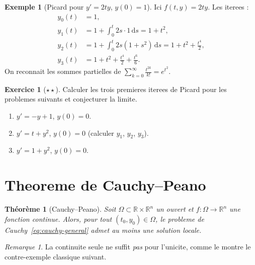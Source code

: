 \documentclass[12pt,a4paper,openany]{book}
\theoremstyle{definition}
\newtheorem{exemple}[definition]{Exemple}
\newtheorem{exercice}{Exercice}[chapter]
\theoremstyle{plain}
\newtheorem{theoreme}[definition]{Théorème}
\theoremstyle{remark}
\newtheorem{remarque}[definition]{Remarque}
\newcommand{\R}{\mathbb{R}}
\newcommand{\dd}{\mathrm{d}}
\begin{document}
\begin{exemple}[Picard pour $y' = 2ty$, $y(0) = 1$]\label{ex:picard-gauss}
Ici $f(t,y) = 2ty$. Les iterees :
\begin{align*}
y_0(t) &= 1, \\
y_1(t) &= 1 + \int_0^t 2s \cdot 1 \, \dd s = 1 + t^2, \\
y_2(t) &= 1 + \int_0^t 2s(1 + s^2)\, \dd s = 1 + t^2 + \frac{t^4}{2}, \\
y_3(t) &= 1 + t^2 + \frac{t^4}{2} + \frac{t^6}{6}.
\end{align*}
On reconnait les sommes partielles de $\sum_{k=0}^\infty \frac{t^{2k}}{k!} = e^{t^2}$.
\end{exemple}

\begin{exercice}[$\star\star$]\label{exo:picard-iteration}
Calculer les trois premieres iterees de Picard pour les problemes suivants et conjecturer la limite.
\begin{enumerate}[label=(\alph*)]
  \item $y' = -y + 1$, $y(0) = 0$.
  \item $y' = t + y^2$, $y(0) = 0$ (calculer $y_1$, $y_2$, $y_3$).
  \item $y' = 1 + y^2$, $y(0) = 0$.
\end{enumerate}
\end{exercice}

\section{Theoreme de Cauchy--Peano}\label{sec:cauchy-peano}

\begin{theoreme}[Cauchy--Peano]\label{thm:cauchy-peano}
Soit $\Omega \subset \R \times \R^n$ un ouvert et $f : \Omega \to \R^n$ une fonction \emph{continue}. Alors, pour tout $(t_0, y_0) \in \Omega$, le probleme de Cauchy~\eqref{eq:cauchy-general} admet \emph{au moins une} solution locale.
\end{theoreme}

\begin{remarque}\label{rem:peano-pas-unicite}
La continuite seule ne suffit \emph{pas} pour l'unicite, comme le montre le contre-exemple classique suivant.
\end{remarque}
\end{document}
